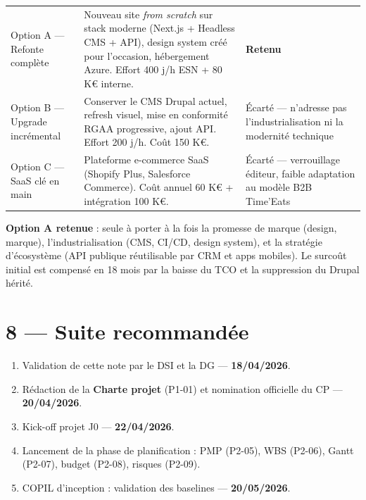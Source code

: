 \documentclass[11pt,a4paper,oneside]{report}
\begin{document}
\renewcommand{\arraystretch}{1.3}
\begin{tabularx}{\textwidth}{L{3cm} Y L{3cm}}
\toprule
{} &  &  \\
\midrule
Option A — Refonte complète & Nouveau site \emph{from scratch} sur stack moderne (Next.js + Headless CMS + API), design system créé pour l'occasion, hébergement Azure. Effort 400 j/h ESN + 80 K€ interne. & \textbf{Retenu} \\
Option B — Upgrade incrémental & Conserver le CMS Drupal actuel, refresh visuel, mise en conformité RGAA progressive, ajout API. Effort 200 j/h. Coût 150 K€. & Écarté — n'adresse pas l'industrialisation ni la modernité technique \\
Option C — SaaS clé en main & Plateforme e-commerce SaaS (Shopify Plus, Salesforce Commerce). Coût annuel 60 K€ + intégration 100 K€. & Écarté — verrouillage éditeur, faible adaptation au modèle B2B Time'Eats \\
\bottomrule
\end{tabularx}

\begin{reco}
\textbf{Option A retenue} : seule à porter à la fois la promesse de marque (design, marque), l'industrialisation (CMS, CI/CD, design system), et la stratégie d'écosystème (API publique réutilisable par CRM et apps mobiles). Le surcoût initial est compensé en 18 mois par la baisse du TCO et la suppression du Drupal hérité.
\end{reco}

\section*{8 — Suite recommandée}

\begin{enumerate}
  \item Validation de cette note par le DSI et la DG --- \textbf{18/04/2026}.
  \item Rédaction de la \textbf{Charte projet} (P1-01) et nomination officielle du CP --- \textbf{20/04/2026}.
  \item Kick-off projet J0 --- \textbf{22/04/2026}.
  \item Lancement de la phase de planification : PMP (P2-05), WBS (P2-06), Gantt (P2-07), budget (P2-08), risques (P2-09).
  \item COPIL d'inception : validation des baselines --- \textbf{20/05/2026}.
\end{enumerate}
\end{document}
